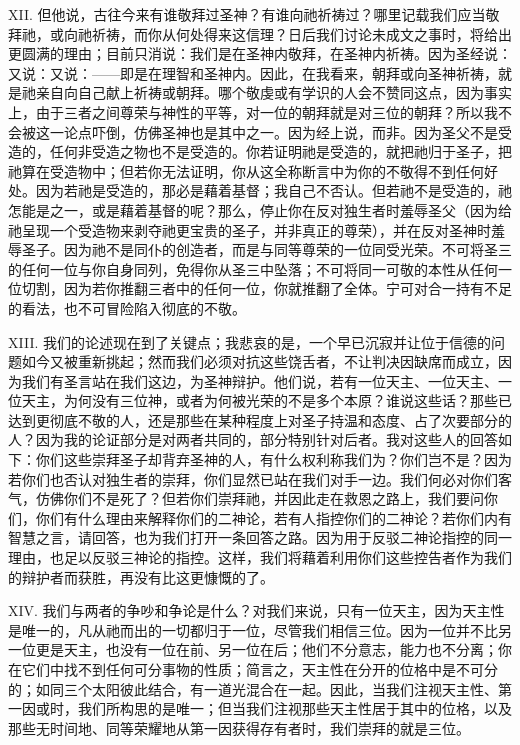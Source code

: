 XII. 但他说，古往今来有谁敬拜过圣神？有谁向祂祈祷过？哪里记载我们应当敬拜祂，或向祂祈祷，而你从何处得来这信理？日后我们讨论未成文之事时，将给出更圆满的理由；目前只消说：我们是在圣神内敬拜，在圣神内祈祷。因为圣经说：又说：又说：——即是在理智和圣神内。因此，在我看来，朝拜或向圣神祈祷，就是祂亲自向自己献上祈祷或朝拜。哪个敬虔或有学识的人会不赞同这点，因为事实上，由于三者之间尊荣与神性的平等，对一位的朝拜就是对三位的朝拜？所以我不会被这一论点吓倒，仿佛圣神也是其中之一。因为经上说，而非。因为圣父不是受造的，任何非受造之物也不是受造的。你若证明祂是受造的，就把祂归于圣子，把祂算在受造物中；但若你无法证明，你从这全称断言中为你的不敬得不到任何好处。因为若祂是受造的，那必是藉着基督；我自己不否认。但若祂不是受造的，祂怎能是之一，或是藉着基督的呢？那么，停止你在反对独生者时羞辱圣父（因为给祂呈现一个受造物来剥夺祂更宝贵的圣子，并非真正的尊荣），并在反对圣神时羞辱圣子。因为祂不是同仆的创造者，而是与同等尊荣的一位同受光荣。不可将圣三的任何一位与你自身同列，免得你从圣三中坠落；不可将同一可敬的本性从任何一位切割，因为若你推翻三者中的任何一位，你就推翻了全体。宁可对合一持有不足的看法，也不可冒险陷入彻底的不敬。\par

XIII. 我们的论述现在到了关键点；我悲哀的是，一个早已沉寂并让位于信德的问题如今又被重新挑起；然而我们必须对抗这些饶舌者，不让判决因缺席而成立，因为我们有圣言站在我们这边，为圣神辩护。他们说，若有一位天主、一位天主、一位天主，为何没有三位神，或者为何被光荣的不是多个本原？谁说这些话？那些已达到更彻底不敬的人，还是那些在某种程度上对圣子持温和态度、占了次要部分的人？因为我的论证部分是对两者共同的，部分特别针对后者。我对这些人的回答如下：你们这些崇拜圣子却背弃圣神的人，有什么权利称我们为？你们岂不是？因为若你们也否认对独生者的崇拜，你们显然已站在我们对手一边。我们何必对你们客气，仿佛你们不是死了？但若你们崇拜祂，并因此走在救恩之路上，我们要问你们，你们有什么理由来解释你们的二神论，若有人指控你们的二神论？若你们内有智慧之言，请回答，也为我们打开一条回答之路。因为用于反驳二神论指控的同一理由，也足以反驳三神论的指控。这样，我们将藉着利用你们这些控告者作为我们的辩护者而获胜，再没有比这更慷慨的了。\par

XIV. 我们与两者的争吵和争论是什么？对我们来说，只有一位天主，因为天主性是唯一的，凡从祂而出的一切都归于一位，尽管我们相信三位。因为一位并不比另一位更是天主，也没有一位在前、另一位在后；他们不分意志，能力也不分离；你在它们中找不到任何可分事物的性质；简言之，天主性在分开的位格中是不可分的；如同三个太阳彼此结合，有一道光混合在一起。因此，当我们注视天主性、第一因或时，我们所构思的是唯一；但当我们注视那些天主性居于其中的位格，以及那些无时间地、同等荣耀地从第一因获得存有者时，我们崇拜的就是三位。\par

